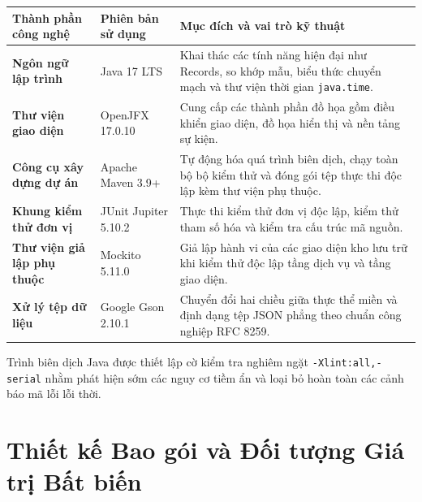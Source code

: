 \documentclass[a4paper,12pt]{report}
\newcommand{\passthrough}[1]{#1}
\newcounter{none}
\begin{document}
{\def\LTcaptype{none} %
\begin{longtable}[]{@{}
  >{\raggedright\arraybackslash}p{}
  >{\raggedright\arraybackslash}p{}
  >{\raggedright\arraybackslash}p{}@{}}
\toprule\noalign{}
\begin{minipage}[b]{\linewidth}\raggedright
Thành phần công nghệ
\end{minipage} & \begin{minipage}[b]{\linewidth}\raggedright
Phiên bản sử dụng
\end{minipage} & \begin{minipage}[b]{\linewidth}\raggedright
Mục đích và vai trò kỹ thuật
\end{minipage} \\
\midrule\noalign{}
\endhead
\bottomrule\noalign{}
\endlastfoot
\textbf{Ngôn ngữ lập trình} & Java 17 LTS & Khai thác các tính năng hiện
đại như Records, so khớp mẫu, biểu thức chuyển mạch và thư viện thời
gian \passthrough{\lstinline!java.time!}. \\
\textbf{Thư viện giao diện} & OpenJFX 17.0.10 & Cung cấp các thành phần
đồ họa gồm điều khiển giao diện, đồ họa hiển thị và nền tảng sự kiện. \\
\textbf{Công cụ xây dựng dự án} & Apache Maven 3.9+ & Tự động hóa quá
trình biên dịch, chạy toàn bộ bộ kiểm thử và đóng gói tệp thực thi độc
lập kèm thư viện phụ thuộc. \\
\textbf{Khung kiểm thử đơn vị} & JUnit Jupiter 5.10.2 & Thực thi kiểm
thử đơn vị độc lập, kiểm thử tham số hóa và kiểm tra cấu trúc mã
nguồn. \\
\textbf{Thư viện giả lập phụ thuộc} & Mockito 5.11.0 & Giả lập hành vi
của các giao diện kho lưu trữ khi kiểm thử độc lập tầng dịch vụ và tầng
giao diện. \\
\textbf{Xử lý tệp dữ liệu} & Google Gson 2.10.1 & Chuyển đổi hai chiều
giữa thực thể miền và định dạng tệp JSON phẳng theo chuẩn công nghiệp
RFC 8259. \\
\end{longtable}
}

Trình biên dịch Java được thiết lập cờ kiểm tra nghiêm ngặt
\passthrough{\lstinline!-Xlint:all,-serial!} nhằm phát hiện sớm các nguy
cơ tiềm ẩn và loại bỏ hoàn toàn các cảnh báo mã lỗi lỗi thời.

\chapter{Thiết kế Bao gói và Đối tượng Giá trị Bất
biến}\label{thiux1ebft-kux1ebf-bao-guxf3i-vuxe0-ux111ux1ed1i-tux1b0ux1ee3ng-giuxe1-trux1ecb-bux1ea5t-biux1ebfn}
\end{document}
